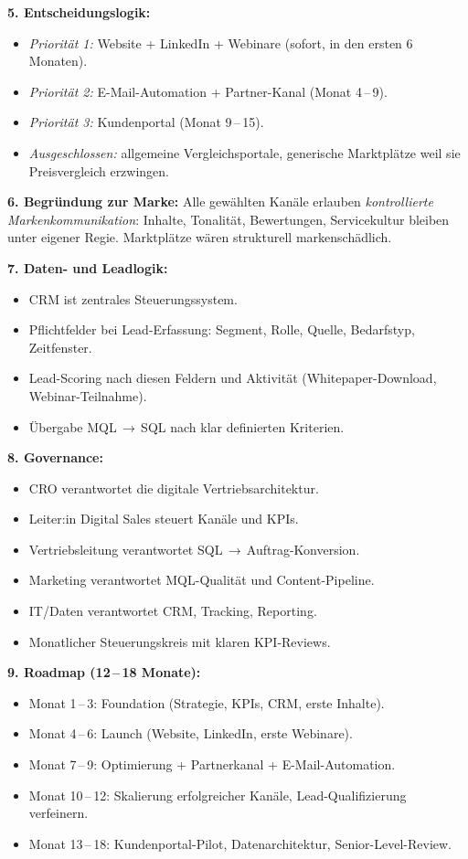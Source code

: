 \documentclass[11pt,a4paper,oneside]{article}
\begin{document}
\begin{loesungbox}
\textbf{5. Entscheidungslogik:}
\begin{itemize}
  \item \emph{Priorität 1:} Website + LinkedIn + Webinare (sofort, in den ersten 6\,Monaten).
  \item \emph{Priorität 2:} E-Mail-Automation + Partner-Kanal (Monat 4\,--\,9).
  \item \emph{Priorität 3:} Kundenportal (Monat 9\,--\,15).
  \item \emph{Ausgeschlossen:} allgemeine Vergleichsportale, generische Marktplätze \textendash{} weil sie Preisvergleich erzwingen.
\end{itemize}

\textbf{6. Begründung zur Marke:}
Alle gewählten Kanäle erlauben \emph{kontrollierte Markenkommunikation}: Inhalte, Tonalität, Bewertungen, Servicekultur bleiben unter eigener Regie. Marktplätze wären strukturell markenschädlich.

\textbf{7. Daten- und Leadlogik:}
\begin{itemize}
  \item CRM ist zentrales Steuerungssystem.
  \item Pflichtfelder bei Lead-Erfassung: Segment, Rolle, Quelle, Bedarfstyp, Zeitfenster.
  \item Lead-Scoring nach diesen Feldern und Aktivität (Whitepaper-Download, Webinar-Teilnahme).
  \item Übergabe MQL\,$\rightarrow$\,SQL nach klar definierten Kriterien.
\end{itemize}

\textbf{8. Governance:}
\begin{itemize}
  \item CRO verantwortet die digitale Vertriebsarchitektur.
  \item Leiter:in Digital Sales steuert Kanäle und KPIs.
  \item Vertriebsleitung verantwortet SQL\,$\rightarrow$\,Auftrag-Konversion.
  \item Marketing verantwortet MQL-Qualität und Content-Pipeline.
  \item IT/Daten verantwortet CRM, Tracking, Reporting.
  \item Monatlicher Steuerungskreis mit klaren KPI-Reviews.
\end{itemize}

\textbf{9. Roadmap (12\,--\,18 Monate):}
\begin{itemize}
  \item Monat 1\,--\,3: Foundation (Strategie, KPIs, CRM, erste Inhalte).
  \item Monat 4\,--\,6: Launch (Website, LinkedIn, erste Webinare).
  \item Monat 7\,--\,9: Optimierung + Partnerkanal + E-Mail-Automation.
  \item Monat 10\,--\,12: Skalierung erfolgreicher Kanäle, Lead-Qualifizierung verfeinern.
  \item Monat 13\,--\,18: Kundenportal-Pilot, Datenarchitektur, Senior-Level-Review.
\end{itemize}


\end{loesungbox}
\end{document}
